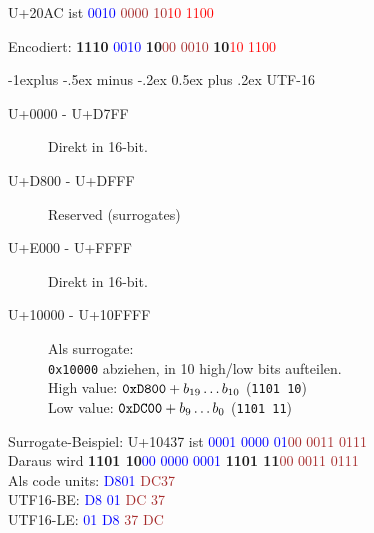 \documentclass[10pt,landscape,a4paper]{article}
\makeatletter
\renewcommand{\subsection}{\@startsection{subsection}{2}{0mm}%
                                {-1explus -.5ex minus -.2ex}%
                                {0.5ex plus .2ex}%
                                {\normalfont\small\bfseries}}
\makeatother
\begin{document}
\begin{multicols*}{3}
U+20AC ist \textcolor{blue}{0010} \textcolor{brown}{0000 10}\textcolor{red}{10 1100}

Encodiert: \textbf{1110} \textcolor{blue}{0010} \textbf{10}\textcolor{brown}{00 0010} \textbf{10}\textcolor{red}{10 1100}


\subsection{UTF-16}

\begin{description}
  \item[U+0000 - U+D7FF] Direkt in 16-bit.
  \item[U+D800 - U+DFFF] Reserved (surrogates)
  \item[U+E000 - U+FFFF] Direkt in 16-bit.
  \item[U+10000 - U+10FFFF] Als surrogate: \\
    \verb|0x10000| abziehen, in 10 high/low bits aufteilen. \\
    High value: $\verb|0xD800| + b_{19}\ldots{}b_{10}$ (\verb|1101 10|) \\
    Low value: $\verb|0xDC00| + b_{9}\ldots{}b_{0}$ (\verb|1101 11|)
\end{description}

\vspace{2em}

Surrogate-Beispiel: U+10437	ist \textcolor{blue}{0001 0000 01}\textcolor{brown}{00 0011 0111} \\
Daraus wird \textbf{1101 10}\textcolor{blue}{00 0000 0001} \textbf{1101 11}\textcolor{brown}{00 0011 0111} \\
Als code units: \textcolor{blue}{D801} \textcolor{brown}{DC37} \\
UTF16-BE: \textcolor{blue}{D8 01} \textcolor{brown}{DC 37} \\
UTF16-LE: \textcolor{blue}{01 D8} \textcolor{brown}{37 DC}

\end{multicols*}
\end{document}
